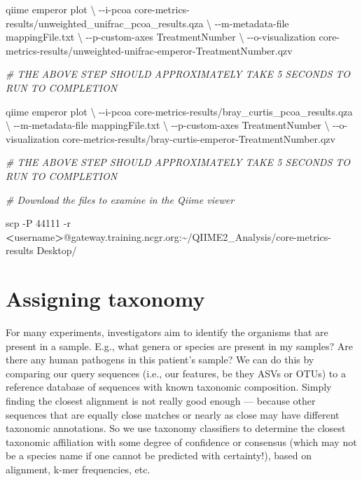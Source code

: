 \documentclass[
]{book}
\newenvironment{Shaded}{\begin{snugshade}}{\end{snugshade}}
\newcommand{\AttributeTok}[1]{\textcolor[rgb]{0.77,0.63,0.00}{#1}}
\newcommand{\CommentTok}[1]{\textcolor[rgb]{0.56,0.35,0.01}{\textit{#1}}}
\newcommand{\DataTypeTok}[1]{\textcolor[rgb]{0.13,0.29,0.53}{#1}}
\newcommand{\ExtensionTok}[1]{#1}
\newcommand{\FunctionTok}[1]{\textcolor[rgb]{0.00,0.00,0.00}{#1}}
\newcommand{\NormalTok}[1]{#1}
\newcommand{\OperatorTok}[1]{\textcolor[rgb]{0.81,0.36,0.00}{\textbf{#1}}}
\begin{document}
\begin{Shaded}
\begin{Highlighting}[]

\ExtensionTok{qiime}\NormalTok{ emperor plot }\DataTypeTok{\textbackslash{}}
\NormalTok{{-}{-}i{-}pcoa core{-}metrics{-}results/unweighted\_unifrac\_pcoa\_results.qza }\DataTypeTok{\textbackslash{}}
\NormalTok{{-}{-}m{-}metadata{-}file mappingFile.txt }\DataTypeTok{\textbackslash{}}
\NormalTok{{-}{-}p{-}custom{-}axes TreatmentNumber  }\DataTypeTok{\textbackslash{}}
\NormalTok{{-}{-}o{-}visualization core{-}metrics{-}results/unweighted{-}unifrac{-}emperor{-}TreatmentNumber.qzv}

\CommentTok{\# THE ABOVE STEP SHOULD APPROXIMATELY TAKE 5 SECONDS TO RUN TO COMPLETION}

\ExtensionTok{qiime}\NormalTok{ emperor plot }\DataTypeTok{\textbackslash{}}
\NormalTok{{-}{-}i{-}pcoa core{-}metrics{-}results/bray\_curtis\_pcoa\_results.qza }\DataTypeTok{\textbackslash{}}
\NormalTok{{-}{-}m{-}metadata{-}file mappingFile.txt }\DataTypeTok{\textbackslash{}}
\NormalTok{{-}{-}p{-}custom{-}axes TreatmentNumber }\DataTypeTok{\textbackslash{}}
\NormalTok{{-}{-}o{-}visualization core{-}metrics{-}results/bray{-}curtis{-}emperor{-}TreatmentNumber.qzv}

\CommentTok{\# THE ABOVE STEP SHOULD APPROXIMATELY TAKE 5 SECONDS TO RUN TO COMPLETION}

\CommentTok{\# Download the files to examine in the Qiime viewer}

\FunctionTok{scp} \AttributeTok{{-}P}\NormalTok{ 44111 }\AttributeTok{{-}r} \OperatorTok{\textless{}}\NormalTok{username}\OperatorTok{\textgreater{}}\NormalTok{@gateway.training.ncgr.org:\textasciitilde{}/QIIME2\_Analysis/core{-}metrics{-}results Desktop/}
\end{Highlighting}
\end{Shaded}

\hypertarget{assigning-taxonomy}{%
\section{Assigning taxonomy}\label{assigning-taxonomy}}

For many experiments, investigators aim to identify the organisms that are present in a sample. E.g., what genera or species are present in my samples? Are there any human pathogens in this patient's sample? We can do this by comparing our query sequences (i.e., our features, be they ASVs or OTUs) to a reference database of sequences with known taxonomic composition. Simply finding the closest alignment is not really good enough --- because other sequences that are equally close matches or nearly as close may have different taxonomic annotations. So we use taxonomy classifiers to determine the closest taxonomic affiliation with some degree of confidence or consensus (which may not be a species name if one cannot be predicted with certainty!), based on alignment, k-mer frequencies, etc.
\end{document}

